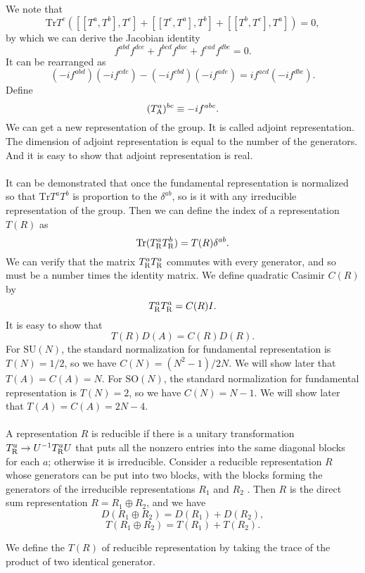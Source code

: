 \noindent
We note that
\[\mathrm{Tr} T^e\left([[T^a,T^b],T^c] + [[T^c,T^a],T^b] + [[T^b,T^c],T^a] \right) = 0,\]
by which we can derive the Jacobian identity
\[f^{abd}f^{dce} + f^{bcd}f^{dae} + f^{cad}f^{dbe} = 0.\]
It can be rearranged as 
\[(-if^{abd})(-if^{cde})-(-if^{cbd})(-if^{ade}) = if^{acd} (-if^{dbe}).\]
Define
\[(T^a_{\rm A})^{bc} \equiv -if^{abc}.\]
We can get a new representation of the group. It is called adjoint representation. The dimension of adjoint representation is equal to the number of the generators. And it is easy to show that adjoint representation is real.
\\ \\
It can be demonstrated that once the fundamental representation is normalized so that $\mathrm{Tr}T^aT^b$ is proportion to the $\delta^{ab}$, so is it with any irreducible representation of the group. Then we can define the index of a representation $T(R)$ as
\[\mathrm{Tr}(T^a_{\rm R} T^b_{\rm R}) = T(R)\delta^{ab}.\]
We can verify that the matrix $T^a_{\rm R} T^a_{\rm R}$ commutes with
every generator, and so must be a number times the identity matrix. We define quadratic Casimir $C(R)$ by
\[T^a_{\rm R} T^a_{\rm R} = C(R)I.\]
It is easy to show that
\[T(R)D(A) = C(R)D(R).\]
For $\mathrm{SU}(N)$, the standard normalization for fundamental representation is $T(N) = {1}/{2}$, so we have $C(N) = {(N^2-1)}/{2N}$. We will show later that $T(A) = C(A) = N$. 
For $\mathrm{SO}(N)$, the standard normalization for fundamental representation is $T(N) = 2$, so we have $C(N) = N-1$. We will show later that $T(A) = C(A) = 2N-4$.
\\ \\
A representation $R$ is reducible if there is a unitary transformation $T^a_{\rm R} \to U^{-1}T^a_{\rm R}U$ that puts all the nonzero entries into the same diagonal blocks
for each $a$; otherwise it is irreducible. 
Consider a reducible representation $R$ whose generators can be put into two blocks, with the blocks forming the generators of the irreducible representations $R_1$ and $R_2$ . Then $R$ is the direct sum representation $R = R_1\oplus R_2$, and we have
\[D(R_1\oplus R_2) = D(R_1) + D(R_2),\]
\[T(R_1\oplus R_2) = T(R_1) + T(R_2).\]
\begin{note}
We define the $T(R)$ of reducible representation by taking the trace of the product of two identical generator.
\end{note}


